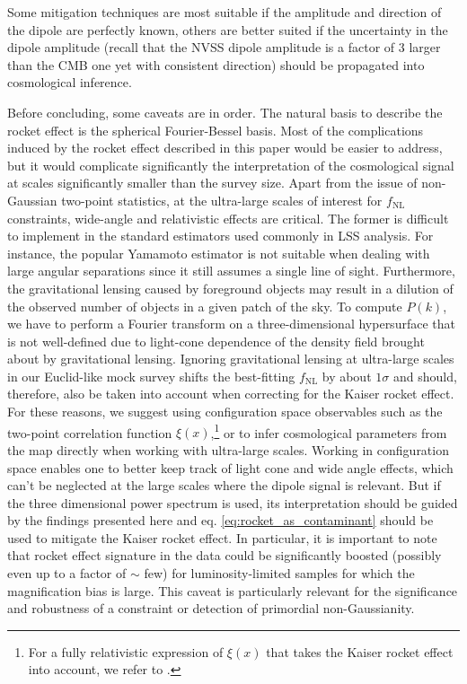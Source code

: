 \documentclass[a4paper,11pt]{article}
\begin{document}
Some mitigation techniques are most suitable if the amplitude and direction of the dipole are perfectly known, others are better suited if the uncertainty in the dipole amplitude (recall that the NVSS dipole amplitude is a factor of 3 larger than the CMB one yet with consistent direction) should be propagated into cosmological inference.  

Before concluding, some caveats are in order. 
The natural basis to describe the rocket effect is the spherical Fourier-Bessel basis. Most of the complications induced by the rocket effect described in this paper would be easier to address, but it would complicate significantly the  interpretation of the cosmological signal  at scales significantly smaller than the survey size.  
Apart from the issue of non-Gaussian two-point statistics, at the ultra-large scales of interest for $f_\mathrm{NL}$ constraints, wide-angle and relativistic effects are critical. The former is difficult to implement in the standard estimators used commonly in LSS analysis. For instance, the popular Yamamoto estimator \cite{Yamamoto:2005dz} is not suitable when dealing with large angular separations since it still assumes a single line of sight. Furthermore, the gravitational lensing caused by foreground objects may result in a dilution of the observed number of objects in a given patch of the sky. To compute $P(k)$, we have to perform a Fourier transform on a three-dimensional hypersurface that is not well-defined due to light-cone dependence of the density field brought about by gravitational lensing. Ignoring gravitational lensing at ultra-large scales in our Euclid-like mock survey shifts the best-fitting $f_\mathrm{NL}$ by about $1\sigma$ \cite{Bernal:2020pwq} and should, therefore, also be taken into account when correcting for the Kaiser rocket effect. For these reasons, we suggest using configuration space observables such as the two-point correlation function $\xi(x)$,\footnote{For a fully relativistic expression of $\xi(x)$ that takes the Kaiser rocket effect into account, we refer to \cite{Bertacca:2019wyg}.} or to infer cosmological parameters from the map directly when working with ultra-large scales. Working in configuration space enables one to better keep track of light cone  and wide angle effects, which can’t be neglected at the large  scales where the dipole signal is relevant.
But if the three dimensional power spectrum is used, its interpretation should be guided by the findings presented here and eq. \eqref{eq:rocket_as_contaminant} should be used to mitigate the Kaiser rocket effect.
In particular, it is important to note that rocket effect signature in the data could be significantly boosted (possibly even up to a factor of $\sim$ few)  for luminosity-limited samples for which the magnification bias is large. This caveat is particularly relevant for the significance and robustness of a constraint or detection of primordial non-Gaussianity.
\end{document}
